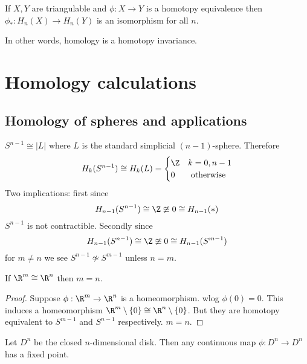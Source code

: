 \documentclass[a4paper]{article}
\begin{document}
\begin{corollary}
  If \(X, Y\) are triangulable and \(\phi: X \to Y\) is a homotopy equivalence then \(\phi_*: H_n(X) \to H_n(Y)\) is an isomorphism for all \(n\).
\end{corollary}

In other words, homology is a homotopy invariance.

\section{Homology calculations}

\subsection{Homology of spheres and applications}

\begin{eg}
  \(S^{n - 1} \cong |L|\) where \(L\) is the standard simplicial \((n - 1)\)-sphere. Therefore
  \[
    H_k(S^{n - 1}) \cong H_k(L) =
    \begin{cases}
      \Z & k = 0, n - 1 \\
      0 & \text{ otherwise}
    \end{cases}
  \]
  Two implications: first since
  \[
    H_{n - 1}(S^{n - 1}) \cong \Z \ncong 0 \cong H_{n - 1}(*)
  \]
  \(S^{n - 1}\) is not contractible. Secondly since
  \[
    H_{n - 1}(S^{n - 1}) \cong \Z \ncong 0 \cong H_{n - 1}(S^{m - 1})
  \]
  for \(m \neq n\) we see \(S^{n - 1} \nsimeq S^{m - 1}\) unless \(n = m\).
\end{eg}

\begin{theorem}
  If \(\R^m \cong \R^n\) then \(m = n\).
\end{theorem}

\begin{proof}
  Suppose \(\phi: \R^m \to \R^n\) is a homeomorphism. wlog \(\phi(0) = 0\). This induces a homeomorphism \(\R^m \setminus \{0\} \cong \R^n \setminus \{0\}\). But they are homotopy equivalent to \(S^{m - 1}\) and \(S^{n - 1}\) respectively. \(m = n\).
\end{proof}

\begin{theorem}
  Let \(D^n\) be the closed \(n\)-dimensional disk. Then any continuous map \(\phi: D^n \to D^n\) has a fixed point.
\end{theorem}
\end{document}
